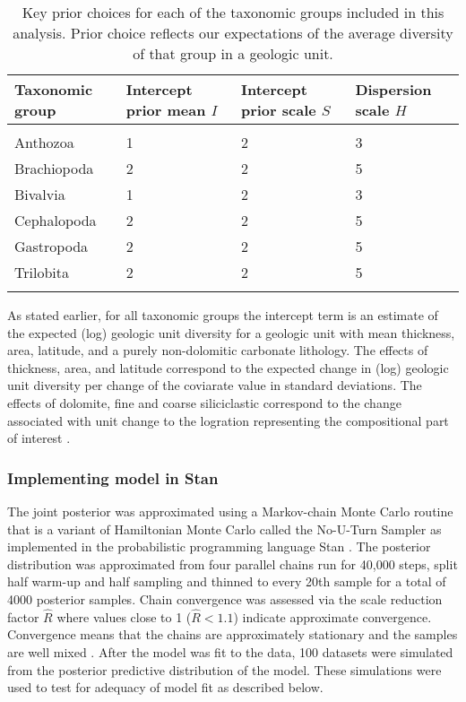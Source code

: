 \documentclass[12pt,letterpaper]{article}
\begin{document}
\begin{table}
  \centering
  \begin{tabular}{ l l l l }
    Taxonomic group & Intercept prior mean \(I\) & Intercept prior scale \(S\) & Dispersion scale \(H\) \\
    \hline \\
    Anthozoa & 1 & 2 & 3 \\
    Brachiopoda & 2 & 2 & 5 \\
    Bivalvia & 1 & 2 & 3 \\
    Cephalopoda & 2 & 2 & 5 \\
    Gastropoda & 2 & 2 & 5 \\
    Trilobita & 2 & 2 & 5 \\
    \hline \\
  \end{tabular}
  \caption{Key prior choices for each of the taxonomic groups included in this analysis. Prior choice reflects our expectations of the average diversity of that group in a geologic unit.}
  \label{tab:prior}
\end{table}

As stated earlier, for all taxonomic groups the intercept term is an estimate of the expected (log) geologic unit diversity for a geologic unit with mean thickness, area, latitude, and a purely non-dolomitic carbonate lithology. The effects of thickness, area, and latitude correspond to the expected change in (log) geologic unit diversity per change of the coviarate value in standard deviations. The effects of dolomite, fine and coarse siliciclastic correspond to the change associated with unit change to the logration representing the compositional part of interest \citep{Hron2012}.

\subsubsection{Implementing model in Stan}

The joint posterior was approximated using a Markov-chain Monte Carlo routine that is a variant of Hamiltonian Monte Carlo called the No-U-Turn Sampler as implemented in the probabilistic programming language Stan \citep{StanPaper}. The posterior distribution was approximated from four parallel chains run for 40,000 steps, split half warm-up and half sampling and thinned to every 20th sample for a total of 4000 posterior samples. Chain convergence was assessed via the scale reduction factor \(\hat{R}\) where values close to 1 (\(\hat{R} < 1.1\)) indicate approximate convergence. Convergence means that the chains are approximately stationary and the samples are well mixed \citep{BDA3}. After the model was fit to the data, 100 datasets were simulated from the posterior predictive distribution of the model. These simulations were used to test for adequacy of model fit as described below.
\end{document}
